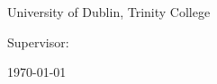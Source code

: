 \begin{titlepage}
\begin{center}
\vspace*{1.5cm}

\begin{figure}[h]
\centering
\end{figure}

{\scshape\LARGE \college \par University of Dublin, Trinity College\par}
\vspace{1.5cm}
{\scshape\Large \typeofthesis \par}
\vspace{0.5cm}
{\huge\bfseries \thesistitle \par}
\vspace{2cm}
{\Large\itshape \authorname \par}
\vspace{1cm}
{\large Supervisor: \supervisor \par}
\vspace{1cm}
{\large \degree \par}
\vspace{1.5cm}
{\large \today\par}
\end{center}
\end{titlepage}

